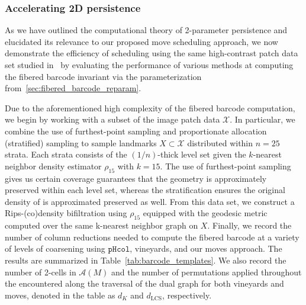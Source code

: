 \documentclass[sn-mathphys]{sn-jnl}
\begin{document}
\subsubsection{Accelerating 2D persistence}\label{sec:empirical_klein}
As we have outlined the computational theory of 2-parameter persistence and elucidated its relevance to our proposed move scheduling approach, we now demonstrate the efficiency of scheduling using the same high-contrast patch data set studied in~\cite{lee2003nonlinear} by evaluating the performance of various methods at computing the fibered barcode invariant via the parameterization from~\ref{sec:fibered_barcode_reparam}. 

Due to the aforementioned high complexity of the fibered barcode computation, we begin by working with a subset of the image patch data $\mathcal{X}$. 
In particular, we combine the use of furthest-point sampling and proportionate allocation (stratified) sampling to sample landmarks $X \subset \mathcal{X}$ distributed within $n = 25$ strata. Each strata consists of the $(1/n)$-thick level set given the $k$-nearest neighbor density estimator $\rho_{15}$ with $k = 15$. The use of furthest-point sampling gives us certain coverage guarantees that the geometry is approximately preserved within each level set, whereas the stratification ensures the original density of is approximated preserved as well. 
From this data set, we construct a Rips-(co)density bifiltration using $\rho_{15}$ equipped with the geodesic metric computed over the same k-nearest neighbor graph on $X$. 
Finally, we record the number of column reductions needed to compute the fibered barcode at a variety of levels of coarsening using $\mathtt{pHcol}$, vineyards, and our moves approach. The results are summarized in Table~\ref{tab:barcode_templates}. We also record the number of 2-cells in $\mathcal{A}(M)$ and the number of permutations applied throughout the encountered along the traversal of the dual graph for both vineyards and moves, denoted in the table as $d_K$ and $d_{\mathrm{LCS}}$, respectively. 
\end{document}
